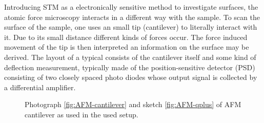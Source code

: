 Introducing STM as a electronically sensitive method to investigate surfaces, the atomic force microscopy interacts in a different way with the sample.
To scan the surface of the sample, one uses an small tip (cantilever) to literally interact with it. Due to its small distance different kinds of forces occur. The force induced movement of the tip is then interpreted an information on the surface may be derived.
The layout of a typical  consists of the cantilever itself and some kind of deflection measurement, typically made of the position-sensitive detector (PSD) consisting of two closely spaced photo diodes whose output signal is collected by a differential amplifier.

\begin{figure}\centering
	
	\caption{Photograph \ref{fig:AFM-cantilever} and sketch \ref{fig:AFM-qplus} of AFM cantilever as used in the used setup. }
	\label{fig:AFM-tuning-fork}
\end{figure}	


